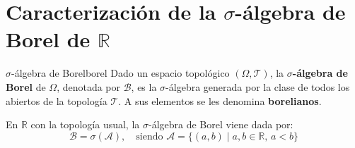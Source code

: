 \section{Caracterización de la \texorpdfstring{$\sigma$}{sigma}-álgebra de Borel de \texorpdfstring{$\mathbb{R}$}{R}}

\begin{definicion}{$\sigma$-álgebra de Borel}{borel}
Dado un espacio topológico $(\Omega, \mathcal{T})$, la \textbf{$\sigma$-álgebra de Borel} de $\Omega$, denotada por $\mathcal{B}$, es la $\sigma$-álgebra generada por la clase de todos los abiertos de la topología $\mathcal{T}$. A sus elementos se les denomina \textbf{borelianos}.

En $\mathbb{R}$ con la topología usual, la $\sigma$-álgebra de Borel viene dada por:
\[
    \mathcal{B} = \sigma(\mathcal{A}), \quad \text{siendo } \mathcal{A} = \{ (a,b) \mid a,b \in \mathbb{R}, \, a < b \}
\]
\end{definicion}

